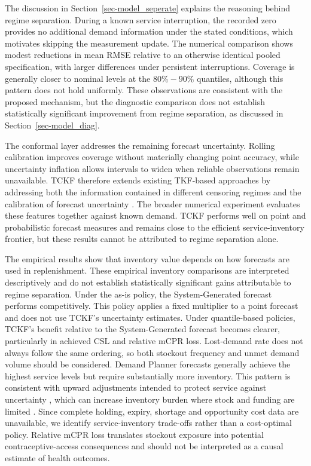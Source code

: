 \documentclass[
  11pt,
  authoryear,
  doubleblind,
  3p]{elsarticle}
\begin{document}
The discussion in Section~\ref{sec-model_seperate} explains the
reasoning behind regime separation. During a known service interruption,
the recorded zero provides no additional demand information under the
stated conditions, which motivates skipping the measurement update. The
numerical comparison shows modest reductions in mean RMSE relative to an
otherwise identical pooled specification, with larger differences under
persistent interruptions. Coverage is generally closer to nominal levels
at the \(80\%-90\%\) quantiles, although this pattern does not hold
uniformly. These observations are consistent with the proposed
mechanism, but the diagnostic comparison does not establish
statistically significant improvement from regime separation, as
discussed in Section~\ref{sec-model_diag}.

The conformal layer addresses the remaining forecast uncertainty.
Rolling calibration improves coverage without materially changing point
accuracy, while uncertainty inflation allows intervals to widen when
reliable observations remain unavailable. TCKF therefore extends
existing TKF-based approaches by addressing both the information
contained in different censoring regimes and the calibration of forecast
uncertainty \citep{trapero2024}. The broader numerical experiment
evaluates these features together against known demand. TCKF performs
well on point and probabilistic forecast measures and remains close to
the efficient service-inventory frontier, but these results cannot be
attributed to regime separation alone.

The empirical results show that inventory value depends on how forecasts
are used in replenishment. These empirical inventory comparisons are
interpreted descriptively and do not establish statistically significant
gains attributable to regime separation. Under the as-is policy, the
System-Generated forecast performs competitively. This policy applies a
fixed multiplier to a point forecast and does not use TCKF's uncertainty
estimates. Under quantile-based policies, TCKF's benefit relative to the
System-Generated forecast becomes clearer, particularly in achieved CSL
and relative mCPR loss. Lost-demand rate does not always follow the same
ordering, so both stockout frequency and unmet demand volume should be
considered. Demand Planner forecasts generally achieve the highest
service levels but require substantially more inventory. This pattern is
consistent with upward adjustments intended to protect service against
uncertainty \citep{fahimnia2023}, which can increase inventory burden
where stock and funding are limited \citep{natarajan2014}. Since
complete holding, expiry, shortage and opportunity cost data are
unavailable, we identify service-inventory trade-offs rather than a
cost-optimal policy. Relative mCPR loss translates stockout exposure
into potential contraceptive-access consequences and should not be
interpreted as a causal estimate of health outcomes.
\end{document}
